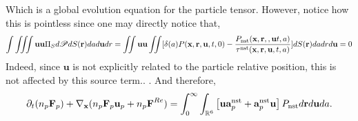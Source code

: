 Which is a global evolution equation for the particle tensor. 
However, notice how this is pointless since one may directly notice that, 
\begin{align*}
    \int\iiint \textbf{uu}\Pi_S  d\mathscr{P} dS(\textbf{r}) da d\textbf{u} dr =
    \iint \textbf{uu} 
    \iint [\delta(a)P(\textbf{x},\textbf{r},\textbf{u},t,0)
    - \frac{P_\text{nst}(\textbf{x},\textbf{r},,\textbf{u}t,a)}{\tau^\text{nst}(\textbf{x},\textbf{r},\textbf{u},t,a)}] dS(\textbf{r}) da
    dr d \textbf{u}
    = 0 
\end{align*}
Indeed, since $\textbf{u}$ is not explicitly related to the particle relative position, this is not affected by this source term.. . 
And therefore, 
\begin{equation*}
    \partial_t (n_p \textbf{F}_p )
    +{\mathbf{\nabla}_\textbf{x}} (n_p\textbf{F}_p \textbf{u}_p  + n_p \textbf{F}^{Re})
    = 
    \int_{0}^\infty
    \int_{\mathbb{R}^6} \left[
        \textbf{u} \textbf{a}^\text{nst}_p
        + \textbf{a}^\text{nst}_p\textbf{u}
    \right]P_\text{nst}
    d\textbf{r}
    d\textbf{u}
    da.
\end{equation*}

